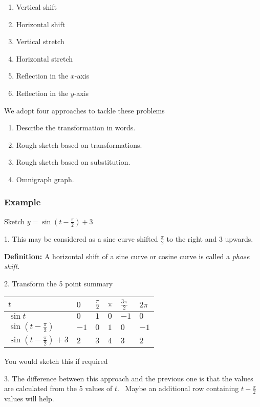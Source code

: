 \begin{enumerate}
\item Vertical shift 
\item Horizontal shift 
\item Vertical stretch 
\item Horizontal stretch 
\item Reflection in the $x$-axis 
\item Reflection in the $y$-axis 
\end{enumerate}

We adopt four approaches to tackle these problems 

\begin{enumerate}
\item Describe the transformation in words. 
\item Rough sketch based on transformations. 
\item Rough sketch based on substitution. 
\item Omnigraph
graph. 
\end{enumerate}


\subsubsection{Example}
Sketch $y =\sin  \left (t -\frac{\pi }{2}\right ) +3$ 

1. This may be considered as a sine curve shifted $\frac{\pi }{2}$ to the right and $3$ upwards. 

\textbf{Definition:} A horizontal shift of a sine curve or cosine curve is called a \emph{phase
shift}. 

2. Transform the 5 point summary 


\begin{tabular}[c]{|l|l|l|l|l|l|}\hline
$t$  & $0$  & $\frac{\pi }{2}$  & $\pi $  & $\frac{3 \pi }{2}$  & $2 \pi $  \\
\hline
$\sin  t$  & $0$  & $1$  & $0$  & $ -1$  & $0$  \\
\hline
$\sin  \left (t -\frac{\pi }{2}\right )$  & $ -1$  & $0$  & $1$  & $0$  & $ -1$  \\
\hline
$\sin  \left (t -\frac{\pi }{2}\right ) +3$  & $2$  & $3$  & $4$  & $3$  & $2$  \\
\hline
\end{tabular}

You would sketch this if required 

3. The difference between this approach and the previous one is that the values are calculated
from the 5 values of $t$. \ Maybe an additional row containing $t -\frac{\pi }{2}$ values will help. 


